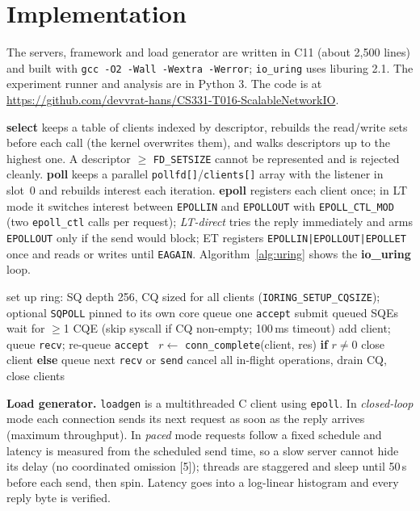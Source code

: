 \documentclass[conference,10pt]{IEEEtran}
\newcommand{\us}{\,\textmu s}
\newcommand{\code}[1]{\texttt{#1}}
\begin{document}
\section{Implementation}
The servers, framework and load generator are written in C11 (about 2{,}500 lines) and built with \code{gcc -O2 -Wall -Wextra -Werror}; \code{io\_uring} uses liburing 2.1. The experiment runner and analysis are in Python 3. The code is at \url{https://github.com/devvrat-hans/CS331-T016-ScalableNetworkIO}.

\textbf{select} keeps a table of clients indexed by descriptor, rebuilds the read/write sets before each call (the kernel overwrites them), and walks descriptors up to the highest one. A descriptor $\geq$ \code{FD\_SETSIZE} cannot be represented and is rejected cleanly. \textbf{poll} keeps a parallel \code{pollfd[]}/\code{clients[]} array with the listener in slot~0 and rebuilds interest each iteration. \textbf{epoll} registers each client once; in LT mode it switches interest between \code{EPOLLIN} and \code{EPOLLOUT} with \code{EPOLL\_CTL\_MOD} (two \code{epoll\_ctl} calls per request); \emph{LT-direct} tries the reply immediately and arms \code{EPOLLOUT} only if the send would block; ET registers \code{EPOLLIN|EPOLLOUT|EPOLLET} once and reads or writes until \code{EAGAIN}. Algorithm~\ref{alg:uring} shows the \textbf{io\_uring} loop.

\begin{algorithm}[t]
\caption{io\_uring event loop (one thread)}\label{alg:uring}
\small
\begin{algorithmic}[1]
\State set up ring: SQ depth 256, CQ sized for all clients (\code{IORING\_SETUP\_CQSIZE}); optional \code{SQPOLL} pinned to its own core
\State queue one \code{accept}
  \State submit queued SQEs \Comment{one \code{io\_uring\_enter} for all}
  \State wait for $\geq$1 CQE (skip syscall if CQ non-empty; 100\,ms timeout)
      add client; queue \code{recv}; re-queue \code{accept}
     \Else \ $r \gets$ \code{conn\_complete}(client, res)
        \State \textbf{if} $r \neq 0$ close client \textbf{else} queue next \code{recv} or \code{send}
     \EndIf
  \EndFor
\EndWhile
\State cancel all in-flight operations, drain CQ, close clients
\end{algorithmic}
\end{algorithm}

\textbf{Load generator.} \code{loadgen} is a multithreaded C client using \code{epoll}. In \emph{closed-loop} mode each connection sends its next request as soon as the reply arrives (maximum throughput). In \emph{paced} mode requests follow a fixed schedule and latency is measured from the scheduled send time, so a slow server cannot hide its delay (no coordinated omission [5]); threads are staggered and sleep until 50\us{} before each send, then spin. Latency goes into a log-linear histogram and every reply byte is verified.
\end{document}
